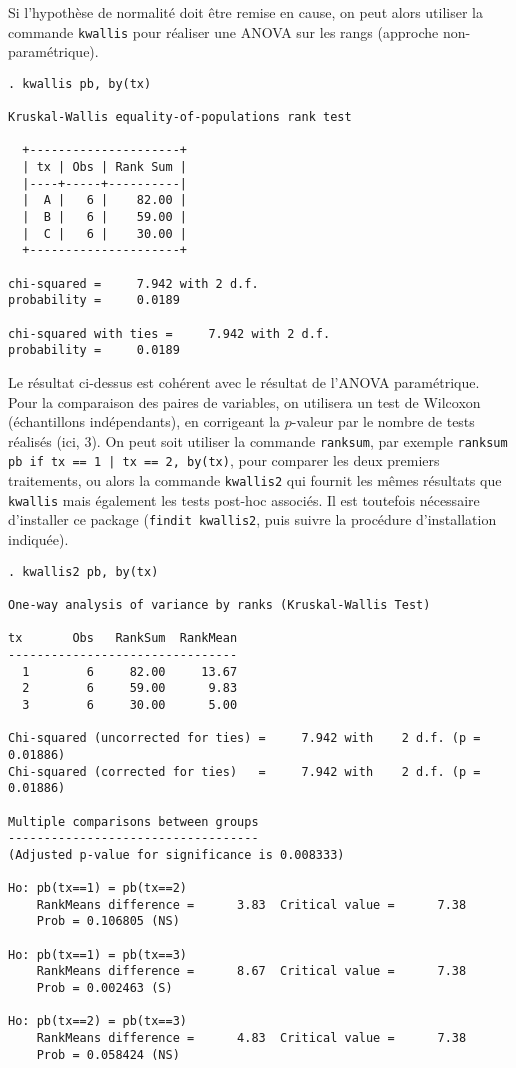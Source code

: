 Si l'hypothèse de normalité doit être remise en cause, on peut alors
utiliser la commande \texttt{kwallis} pour réaliser une ANOVA sur les rangs
(approche non-paramétrique).
\begin{verbatim}
. kwallis pb, by(tx)

Kruskal-Wallis equality-of-populations rank test

  +---------------------+
  | tx | Obs | Rank Sum |
  |----+-----+----------|
  |  A |   6 |    82.00 |
  |  B |   6 |    59.00 |
  |  C |   6 |    30.00 |
  +---------------------+

chi-squared =     7.942 with 2 d.f.
probability =     0.0189

chi-squared with ties =     7.942 with 2 d.f.
probability =     0.0189
\end{verbatim}
Le résultat ci-dessus est cohérent avec le résultat de l'ANOVA
paramétrique. Pour la comparaison des paires de variables, on utilisera un
test de Wilcoxon (échantillons indépendants), en corrigeant la $p$-valeur
par le nombre de tests réalisés (ici, 3). On peut soit utiliser la commande
\texttt{ranksum}, par exemple \verb+ranksum pb if tx == 1 | tx == 2, by(tx)+, 
pour comparer les deux premiers traitements, ou alors la commande
\texttt{kwallis2} qui fournit les mêmes résultats que \texttt{kwallis} mais
également les tests post-hoc associés. Il est toutefois nécessaire
d'installer ce package (\texttt{findit kwallis2}, puis suivre la procédure
d'installation indiquée).
\begin{verbatim}
. kwallis2 pb, by(tx)

One-way analysis of variance by ranks (Kruskal-Wallis Test)

tx       Obs   RankSum  RankMean 
--------------------------------
  1        6     82.00     13.67
  2        6     59.00      9.83
  3        6     30.00      5.00

Chi-squared (uncorrected for ties) =     7.942 with    2 d.f. (p = 0.01886)
Chi-squared (corrected for ties)   =     7.942 with    2 d.f. (p = 0.01886)

Multiple comparisons between groups
-----------------------------------
(Adjusted p-value for significance is 0.008333)

Ho: pb(tx==1) = pb(tx==2)
    RankMeans difference =      3.83  Critical value =      7.38
    Prob = 0.106805 (NS)

Ho: pb(tx==1) = pb(tx==3)
    RankMeans difference =      8.67  Critical value =      7.38
    Prob = 0.002463 (S)

Ho: pb(tx==2) = pb(tx==3)
    RankMeans difference =      4.83  Critical value =      7.38
    Prob = 0.058424 (NS)
\end{verbatim}

